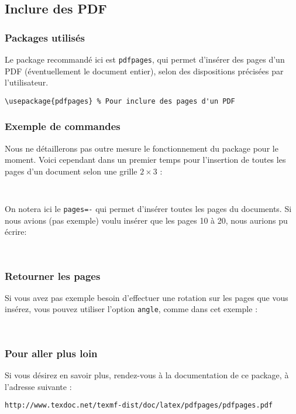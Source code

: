 \subsection{Inclure des PDF}
\subsubsection{Packages utilisés}
Le package recommandé ici est \texttt{pdfpages}, qui permet d'insérer des pages d'un PDF (éventuellement le document entier), selon des dispositions précisées par l'utilisateur.

\begin{lstlisting}[language={[LaTeX]TeX}]
  \usepackage{pdfpages} % Pour inclure des pages d'un PDF
\end{lstlisting}

\subsubsection{Exemple de commandes}
Nous ne détaillerons pas outre mesure le fonctionnement du package pour le moment. Voici cependant dans un premier temps pour l'insertion de toutes les pages d'un document selon une grille $2\times3$ :

\begin{lstlisting}[language={[LaTeX]TeX}]
  
\end{lstlisting}

On notera ici le \texttt{pages=-} qui permet d'insérer toutes les pages du documents. Si nous avions (pas exemple) voulu insérer que les pages 10 à 20, nous aurions pu écrire:

\begin{lstlisting}[language={[LaTeX]TeX}]
  
\end{lstlisting}

\subsubsection{Retourner les pages}
Si vous avez pas exemple besoin d'effectuer une rotation sur les pages que vous insérez, vous pouvez utiliser l'option \texttt{angle}, comme dans cet exemple :
\begin{lstlisting}[language={[LaTeX]TeX}]
  
\end{lstlisting}

\subsubsection{Pour aller plus loin}
Si vous désirez en savoir plus, rendez-vous à la documentation de ce package, à l'adresse suivante :
\begin{center}
  \texttt{http://www.texdoc.net/texmf-dist/doc/latex/pdfpages/pdfpages.pdf}
\end{center}
  
